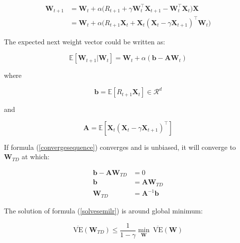\begin{equation}\label{wstosemigradesc}
	\begin{aligned}
		\mathbf{W}_{t+1} &= \mathbf{W}_t+ \alpha \Big ( R_{t+1} + \gamma \mathbf{W}_t^\top \mathbf{X}_{t+1} - \mathbf{W}_t^\top \mathbf{X}_t \Big ) \mathbf{X} \\
		&= \mathbf{W}_t+ \alpha \Big ( R_{t+1}\mathbf{X}_t + \mathbf{X}_t ( \mathbf{X}_t - \gamma \mathbf{X}_{t+1})^\top \mathbf{W}_t  \Big ) 
	\end{aligned}
\end{equation}

The expected next weight vector could be written as:

\begin{equation}\label{convergesequence}
	\mathbb{E}[\mathbf{W}_{t+1} | \mathbf{W}_t] = \mathbf{W}_t + \alpha (\textbf{b} - \mathbf{A} \mathbf{W}_t)
\end{equation}

where 

\begin{equation}
	\textbf{b} = \mathbb{E}[R_{t+1} \mathbf{X}_t] \in \mathcal{R}^d
\end{equation}

and 

\begin{equation}
	\mathbf{A} =  \mathbb{E}[\mathbf{X}_t ( \mathbf{X}_t - \gamma \mathbf{X}_{t+1})^\top]
\end{equation}


If formula (\ref{convergesequence}) converges and is unbiased, it will converge to $\mathbf{W}_{TD}$ at which:

\begin{equation}\label{solvesemilr}
	\begin{aligned}
		\textbf{b} - \mathbf{A} \mathbf{W}_{TD} &= 0\\
		\textbf{b} &= \mathbf{A} \mathbf{W}_{TD} \\
		\mathbf{W}_{TD} &= \mathbf{A}^{-1} \textbf{b}
	\end{aligned}
\end{equation}


The solution of formula (\ref{solvesemilr}) is around global minimum:

\begin{equation}\label{semigradientlrerror}
	\overline{\text{VE}}(\mathbf{W}_{TD}) \leq \frac{1}{1-\gamma} \underset{\mathbf{W}}{\min}\ \overline{\text{VE}}(\mathbf{W})
\end{equation}

